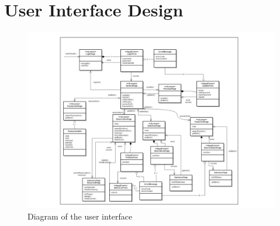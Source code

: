 \section{User Interface Design} \label{sec:user-interface}
\begin{figure}[htbp]
\centering
\includegraphics[width=\textwidth]{Images/UxDiagram.pdf}
\vspace{10pt}
\caption{Diagram of the user interface}
\label{fig:user-interface}
\end{figure}
\clearpage
